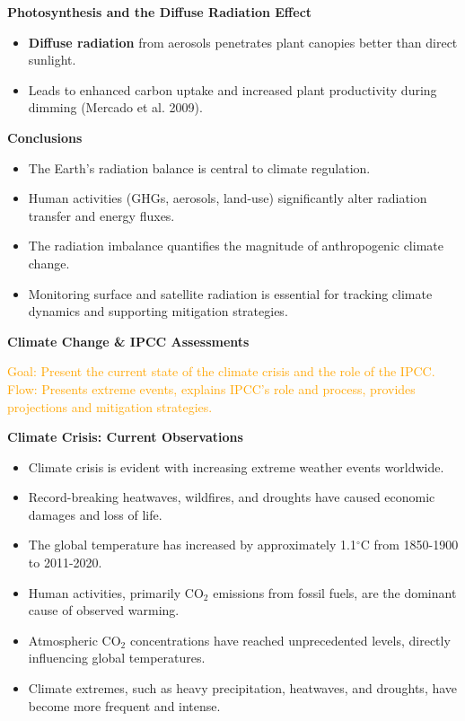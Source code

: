 \documentclass[fontsize=8pt, a4paper, landscape, fleqn]{scrartcl}
\renewcommand{\section}[1]{%
    \noindent\colorbox{sectioncolor}{%
        \parbox{\dimexpr\columnwidth-2\fboxsep}{\color{white}\textbf{#1}}}%
    \vspace{0.5mm}%
}
\renewcommand{\subsection}[1]{%
    \noindent\colorbox{subsectioncolor}{%
        \parbox{\dimexpr\columnwidth-2\fboxsep}{\color{white}\textbf{#1}}}%
    \vspace{0.5mm}%
}
\begin{document}
\begin{multicols*}{3}[\raggedcolumns]
\subsection{Photosynthesis and the Diffuse Radiation Effect}
\begin{itemize}
    \item \textbf{Diffuse radiation} from aerosols penetrates plant canopies better than direct sunlight.
    \item Leads to enhanced carbon uptake and increased plant productivity during dimming (Mercado et al. 2009).
\end{itemize}

\subsection{Conclusions}
\begin{itemize}
    \item The Earth's radiation balance is central to climate regulation.
    \item Human activities (GHGs, aerosols, land-use) significantly alter radiation transfer and energy fluxes.
    \item The radiation imbalance quantifies the magnitude of anthropogenic climate change.
    \item Monitoring surface and satellite radiation is essential for tracking climate dynamics and supporting mitigation strategies.
\end{itemize} 
\section{Climate Change \& IPCC Assessments}
\noindent\textcolor{orange}{
Goal: Present the current state of the climate crisis and the role of the IPCC.\\
Flow: Presents extreme events, explains IPCC's role and process, provides projections and mitigation strategies.
}

\subsection{Climate Crisis: Current Observations}
\begin{itemize}
    \item Climate crisis is evident with increasing extreme weather events worldwide.
    \item Record-breaking heatwaves, wildfires, and droughts have caused economic damages and loss of life.
    \item The global temperature has increased by approximately 1.1$^{\circ}$C from 1850-1900 to 2011-2020.
    \item Human activities, primarily CO$_2$ emissions from fossil fuels, are the dominant cause of observed warming.
    \item Atmospheric CO$_2$ concentrations have reached unprecedented levels, directly influencing global temperatures.
    \item Climate extremes, such as heavy precipitation, heatwaves, and droughts, have become more frequent and intense.
\end{itemize}


\end{multicols*}
\end{document}
